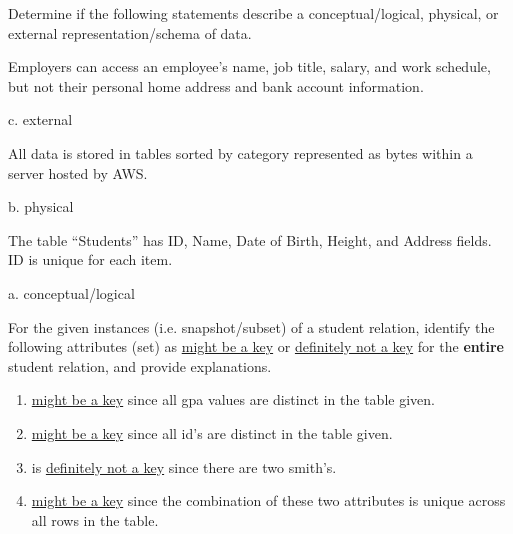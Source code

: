 \documentclass[12pt, letterpaper]{article}
\begin{document}
\color{\TextColor}
\pagecolor{\colormode}
\setlength{\parindent}{0pt}
\pagestyle{fancy}
\fancyhf{}
\fancyhead[ROE]{\color{\TextColor}\jobname --- \thepage}

\begin{problem}{}
    Determine if the following statements describe a conceptual/logical, physical, or external
representation/schema of data.
\end{problem}
\begin{subproblem}{}
    Employers can access an employee's name, job title, salary, and work schedule, but not their
personal home address and bank account information.
\end{subproblem}
\begin{solution}
    c. external
\end{solution}

\begin{subproblem}{}
    All data is stored in tables sorted by category represented as bytes within a server hosted by
AWS.
\end{subproblem}
\begin{solution}
    b. physical
\end{solution}

\begin{subproblem}{}
    The table “Students” has ID, Name, Date of Birth, Height, and Address fields. ID is unique for
each item.
\end{subproblem}
\begin{solution}
    a. conceptual/logical
\end{solution}


\qh
\begin{subproblem}{}
    For the given instances (i.e. snapshot/subset) of a student relation, identify the following attributes
(set) as \underline{might be a key} or \underline{definitely not a key} for the \textbf{entire} student relation, and provide
explanations.
\end{subproblem}
\begin{solution}
    \begin{enumerate}
        \item {} \underline{might be a key} since all gpa values are distinct in the table given.
        \item {} \underline{might be a key} since all id's are distinct in the table given.
        \item {} is \underline{definitely not a key} since there are two smith's.
        \item {} \underline{might be a key} since the combination of these two attributes is unique across all rows in the table.
    \end{enumerate}
\end{solution}
\end{document}
